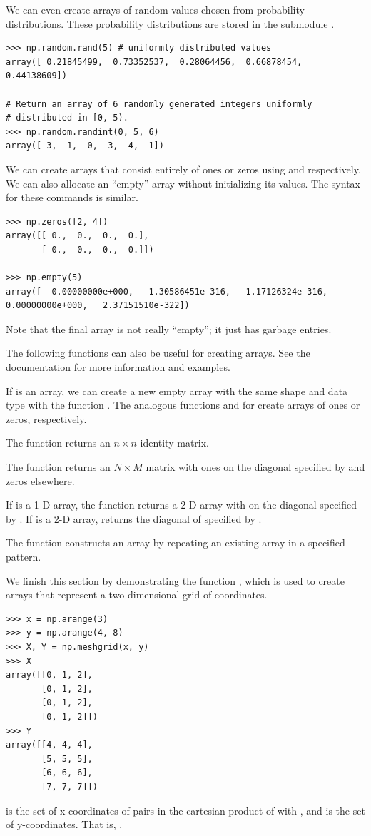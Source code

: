 We can even create arrays of random values chosen
from probability distributions. These probability distributions are stored
in the submodule . 
\begin{lstlisting}
>>> np.random.rand(5) # uniformly distributed values 
array([ 0.21845499,  0.73352537,  0.28064456,  0.66878454,  0.44138609])

# Return an array of 6 randomly generated integers uniformly
# distributed in [0, 5).
>>> np.random.randint(0, 5, 6) 
array([ 3,  1,  0,  3,  4,  1])
\end{lstlisting} 


We can create arrays that
consist entirely of ones or zeros using  and
 respectively. We can also allocate an ``empty'' array without initializing its values. The syntax for these commands is similar.
\begin{lstlisting}
>>> np.zeros([2, 4])
array([[ 0.,  0.,  0.,  0.],
       [ 0.,  0.,  0.,  0.]])
       
>>> np.empty(5)
array([  0.00000000e+000,   1.30586451e-316,   1.17126324e-316,
0.00000000e+000,   2.37151510e-322])
\end{lstlisting} 

Note that the final array is not really ``empty''; it just has garbage entries.

The following functions can also be useful for creating arrays. See the documentation for more information and examples. 

If  is an array, we can create a new empty array with the same shape and data type with the function . The analogous functions  and
 for create arrays of ones or zeros, respectively.

The function  returns an $n \times n$ identity matrix. 

The function  returns an $N \times M$ matrix with ones on the diagonal specified by  and zeros elsewhere. 

If  is a 1-D array, the function  returns a 2-D array with  on the diagonal specified by . If  is a 2-D array,  returns the diagonal of  specified by .

The function  constructs an array by repeating an existing array
 in a specified pattern. 

We finish this section by demonstrating the function , which is used to create arrays that represent a
two-dimensional grid of coordinates.
\begin{lstlisting}
>>> x = np.arange(3) 
>>> y = np.arange(4, 8) 
>>> X, Y = np.meshgrid(x, y) 
>>> X
array([[0, 1, 2],
       [0, 1, 2],
       [0, 1, 2],
       [0, 1, 2]])
>>> Y
array([[4, 4, 4],
       [5, 5, 5],
       [6, 6, 6],
       [7, 7, 7]])
\end{lstlisting} 
 is the set of x-coordinates of pairs in the cartesian product of  with , and  is the set of y-coordinates. That is, .

